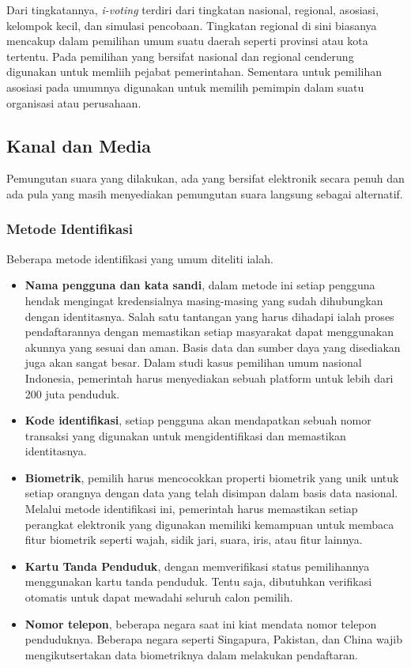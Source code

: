 Dari tingkatannya, \textit{i-voting} terdiri dari tingkatan nasional, regional, asosiasi, kelompok kecil, dan simulasi pencobaan. Tingkatan regional di sini biasanya mencakup dalam pemilihan umum suatu daerah seperti provinsi atau kota tertentu. Pada pemilihan yang bersifat nasional dan regional cenderung digunakan untuk memliih pejabat pemerintahan. Sementara untuk pemilihan asosiasi pada umumnya digunakan untuk memilih pemimpin dalam suatu organisasi atau perusahaan.

\subsection{Kanal dan Media}

Pemungutan suara yang dilakukan, ada yang bersifat elektronik secara penuh dan ada pula yang masih menyediakan pemungutan suara langsung sebagai alternatif.

\subsubsection{Metode Identifikasi}

Beberapa metode identifikasi yang umum diteliti ialah.

\begin{itemize}
    \item \textbf{Nama pengguna dan kata sandi}, dalam metode ini setiap pengguna hendak mengingat kredensialnya masing-masing yang sudah dihubungkan dengan identitasnya. Salah satu tantangan yang harus dihadapi ialah proses pendaftarannya dengan memastikan setiap masyarakat dapat menggunakan akunnya yang sesuai dan aman. Basis data dan sumber daya yang disediakan juga akan sangat besar. Dalam studi kasus pemilihan umum nasional Indonesia, pemerintah harus menyediakan sebuah platform untuk lebih dari 200 juta penduduk. 
    \item \textbf{Kode identifikasi}, setiap pengguna akan mendapatkan sebuah nomor transaksi yang digunakan untuk mengidentifikasi dan memastikan identitasnya.
    \item \textbf{Biometrik}, pemilih harus mencocokkan properti biometrik yang unik untuk setiap orangnya dengan data yang telah disimpan dalam basis data nasional. Melalui metode identifikasi ini, pemerintah harus memastikan setiap perangkat elektronik yang digunakan memiliki kemampuan untuk membaca fitur biometrik seperti wajah, sidik jari, suara, iris, atau fitur lainnya.
    \item \textbf{Kartu Tanda Penduduk}, dengan memverifikasi status pemilihannya menggunakan kartu tanda penduduk. Tentu saja, dibutuhkan verifikasi otomatis untuk dapat mewadahi seluruh calon pemilih.
    \item \textbf{Nomor telepon}, beberapa negara saat ini kiat mendata nomor telepon penduduknya. Beberapa negara seperti Singapura, Pakistan, dan China wajib mengikutsertakan data biometriknya dalam melakukan pendaftaran.
\end{itemize}

